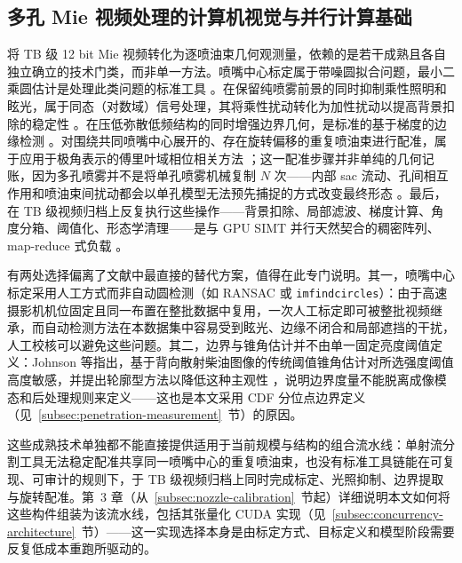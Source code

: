 \subsection{多孔 Mie 视频处理的计算机视觉与并行计算基础}

将 TB 级 12 bit Mie 视频转化为逐喷油束几何观测量，依赖的是若干成熟且各自独立确立的技术门类，而非单一方法。喷嘴中心标定属于带噪圆拟合问题，最小二乘圆估计是处理此类问题的标准工具 \cite{Pratt1987CircleFit,Taubin1991CircleFit}。在保留纯喷雾前景的同时抑制乘性照明和眩光，属于同态（对数域）信号处理，其将乘性扰动转化为加性扰动以提高背景扣除的稳定性 \cite{OppenheimSchaferStockham1968,GonzalezWoodsDIP}。在压低弥散低频结构的同时增强边界几何，是标准的基于梯度的边缘检测 \cite{GonzalezWoodsDIP,Szeliski2011Vision,ZackRogersLatt1977}。对围绕共同喷嘴中心展开的、存在旋转偏移的重复喷油束进行配准，属于应用于极角表示的傅里叶域相位相关方法 \cite{KuglinHines1975PhaseCorrelation,DeCastroMorandi1987RotationFFT}；这一配准步骤并非单纯的几何记账，因为多孔喷雾并不是将单孔喷雾机械复制 $N$ 次——内部 sac 流动、孔间相互作用和喷油束间扰动都会以单孔模型无法预先捕捉的方式改变最终形态 \cite{JinKimKakamiNishidaOgataLuo2020,MopuriGrahnSedarskyHyvonen2024}。最后，在 TB 级视频归档上反复执行这些操作——背景扣除、局部滤波、梯度计算、角度分箱、阈值化、形态学清理——是与 GPU SIMT 并行天然契合的稠密阵列、map-reduce 式负载 \cite{NickollsBuckGarlandSkadron2008}。

有两处选择偏离了文献中最直接的替代方案，值得在此专门说明。其一，喷嘴中心标定采用人工方式而非自动圆检测（如 RANSAC 或 \texttt{imfindcircles}）：由于高速摄影机机位固定且同一布置在整批数据中复用，一次人工标定即可被整批视频继承，而自动检测方法在本数据集中容易受到眩光、边缘不闭合和局部遮挡的干扰，人工校核可以避免这些问题。其二，边界与锥角估计并不由单一固定亮度阈值定义：Johnson 等指出，基于背向散射柴油图像的传统阈值锥角估计对所选强度阈值高度敏感，并提出轮廓型方法以降低这种主观性 \cite{JohnsonNaberLee2012}，说明边界度量不能脱离成像模态和后处理规则来定义——这也是本文采用 CDF 分位点边界定义（见~\ref{subsec:penetration-measurement}~节）的原因。

这些成熟技术单独都不能直接提供适用于当前规模与结构的组合流水线：单射流分割工具无法稳定配准共享同一喷嘴中心的重复喷油束，也没有标准工具链能在可复现、可审计的规则下，于 TB 级视频归档上同时完成标定、光照抑制、边界提取与旋转配准。第~3 章（从~\ref{subsec:nozzle-calibration}~节起）详细说明本文如何将这些构件组装为该流水线，包括其张量化 CUDA 实现（见~\ref{subsec:concurrency-architecture}~节）——这一实现选择本身是由标定方式、目标定义和模型阶段需要反复低成本重跑所驱动的。

